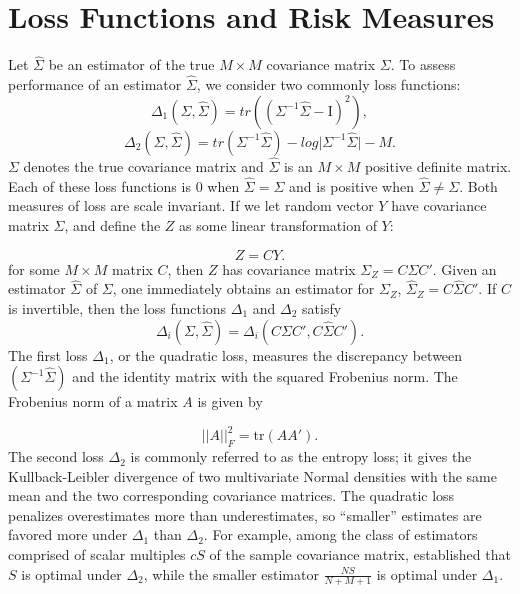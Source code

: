 \section{Loss Functions and Risk Measures}
Let $\hat{\Sigma}$ be an estimator of the true $M \times M$ covariance matrix $\Sigma$. To assess performance of an estimator $\hat{\Sigma}$, we consider two commonly loss functions:
\begin{equation} \label{eq:quad-loss}
\Delta_1\left(\Sigma,\hat{\Sigma} \right) = tr\left(\left( \Sigma^{-1} \hat{\Sigma} - \mathrm{I}\right)^2 \right),
\end{equation}
\noindent
\begin{equation} \label{eq:entropy-loss}
\Delta_2\left(\Sigma,\hat{\Sigma}\right) = tr\left( \Sigma^{-1} \hat{\Sigma} \right) - log \vert \Sigma^{-1} \hat{\Sigma} \vert - M.
\end{equation}
\noindent
$\Sigma$ denotes the true covariance matrix and $\hat{\Sigma}$ is an $M \times M$ positive definite matrix. Each of these loss functions is $0$ when $\hat{\Sigma} = \Sigma$ and is positive when $\hat{\Sigma} \ne \Sigma$. Both measures of loss are scale invariant. If we let random vector $Y$ have covariance matrix $\Sigma$, and define the $Z$ as some linear transformation of $Y$:

\[
Z = CY. 
\]
\noindent
for some $M \times M$ matrix $C$,  then $Z$ has covariance matrix $\Sigma_Z = C \Sigma C'$. Given an estimator $\hat{\Sigma}$ of $\Sigma$, one immediately obtains an estimator for $\Sigma_Z$, $\hat{\Sigma}_Z = C \hat{\Sigma} C'$. If $C$ is invertible, then the loss functions $\Delta_1$ and $\Delta_2$ satisfy
\[
\Delta_i\left(\Sigma,\hat{\Sigma}\right) = \Delta_i\left(C \Sigma C', C \hat{\Sigma}C' \right). 
\]
\noindent
The first loss $\Delta_1$, or the quadratic loss, measures the discrepancy between $\left(\Sigma^{-1} \hat{\Sigma}\right)$ and the identity matrix with the squared Frobenius norm. The Frobenius norm of a matrix $A$ is given by 

\[
\vert \vert A \vert \vert_F^2 = \mbox{tr}\left(A A'\right).
\]
\noindent
The second loss $\Delta_2$ is commonly referred to as the entropy loss; it gives the Kullback-Leibler divergence of two multivariate Normal densities with the same mean and the two corresponding covariance matrices. The quadratic loss penalizes overestimates more than underestimates, so ``smaller'' estimates are favored more under $\Delta_1$ than $\Delta_2$. For example, among the class of estimators comprised of scalar multiples $cS$ of the sample covariance matrix, \cite{haff1980empirical} established that $S$ is optimal under $\Delta_2$, while the smaller estimator $\frac{NS}{N+M+1}$ is optimal under $\Delta_1$. 


